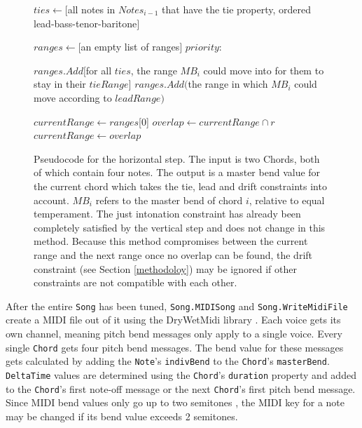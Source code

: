 \documentclass[a4paper]{article}
\newlength\myindent
\newcommand{\IndState}[1][1]{\State\hspace{#1\myindent}}
\begin{document}
\begin{figure}
	\begin{algorithmic}[1]
		\State $\mathit{ties} \gets [$all notes in $\mathit{Notes}_{i-1}$ that have the tie property, ordered lead-bass-tenor-baritone$]$
		
		\State $\mathit{ranges} \gets [$an empty list of ranges$]$
		 $\mathit{priority}$:
		
		\IndState $\mathit{ranges}.Add[$for all $\mathit{ties}$, the range $\mathit{MB}_i$ could move into for them to stay in their $\mathit{tieRange}]$
		\IndState $\mathit{ranges.Add}($the range in which $\mathit{MB}_i$ could move according to $\mathit{leadRange})$
		
		\State{}
		\Else
		\State $\mathit{currentRange} \gets \mathit{ranges}$[0]
		\State $\mathit{overlap} \gets \mathit{currentRange} \cap r$
		\State {}
		\Else
		\State $\mathit{currentRange} \gets \mathit{overlap}$
		\EndIf
		\EndFor
		
		\State{}
		\EndIf
		\EndProcedure
	\end{algorithmic}
	\caption{Pseudocode for the horizontal step. The input is two Chords, both of which contain four notes. The output is a master bend value for the current chord which takes the tie, lead and drift constraints into account. $\mathit{MB}_i$ refers to the master bend of chord $i$, relative to equal temperament. The just intonation constraint has already been completely satisfied by the vertical step and does not change in this method. Because this method compromises between the current range and the next range once no overlap can be found, the drift constraint (see Section \ref{methodoloy}) may be ignored if other constraints are not compatible with each other.}
	\label{fig:pseudocodeH}
\end{figure}

After the entire \texttt{Song} has been tuned, \texttt{Song.MIDISong} and \texttt{Song.WriteMidiFile} create a MIDI file out of it using the DryWetMidi library \cite{dobroselsky_melanchalldrywetmidi_2023}. Each voice gets its own channel, meaning pitch bend messages only apply to a single voice. Every single \texttt{Chord} gets four pitch bend messages. The bend value for these messages gets calculated by adding the \texttt{Note}'s \texttt{indivBend} to the \texttt{Chord}'s \texttt{masterBend}. \texttt{DeltaTime} values are determined using the \texttt{Chord}'s \texttt{duration} property and added to the \texttt{Chord}'s first note-off message or the next \texttt{Chord}'s first pitch bend message. Since MIDI bend values only go up to two semitones \cite{midi_manufacturers_association_complete_2014}, the MIDI key for a note may be changed if its bend value exceeds 2 semitones.
\end{document}
